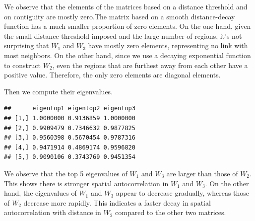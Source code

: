 \documentclass[
  a4paper,
]{article}
\newenvironment{Shaded}{\begin{snugshade}}{\end{snugshade}}
\newcommand{\CommentTok}[1]{\textcolor[rgb]{0.56,0.35,0.01}{\textit{#1}}}
\newcommand{\DecValTok}[1]{\textcolor[rgb]{0.00,0.00,0.81}{#1}}
\newcommand{\FunctionTok}[1]{\textcolor[rgb]{0.13,0.29,0.53}{\textbf{#1}}}
\newcommand{\NormalTok}[1]{#1}
\newcommand{\OtherTok}[1]{\textcolor[rgb]{0.56,0.35,0.01}{#1}}
\newcommand{\SpecialCharTok}[1]{\textcolor[rgb]{0.81,0.36,0.00}{\textbf{#1}}}
\begin{document}
We observe that the elements of the matrices based on a distance
threshold and on contiguity are mostly zero.The matrix based on a smooth
distance-decay function has a much smaller proportion of zero elements.
On the one hand, given the small distance threshold imposed and the
large number of regions, it's not surprising that \(W_1\) and \(W_3\)
have mostly zero elements, representing no link with most neighbors. On
the other hand, since we use a decaying exponential function to
construct \(W_2\), even the regions that are furthest away from each
other have a positive value. Therefore, the only zero elements are
diagonal elements.

Then we compute their eigenvalues.

\begin{Shaded}
\end{Shaded}

\begin{verbatim}
##      eigentop1 eigentop2 eigentop3
## [1,] 1.0000000 0.9136859 1.0000000
## [2,] 0.9909479 0.7346632 0.9877825
## [3,] 0.9560398 0.5670454 0.9787316
## [4,] 0.9471914 0.4869174 0.9596820
## [5,] 0.9090106 0.3743769 0.9451354
\end{verbatim}

We observe that the top 5 eigenvalues of \(W_1\) and \(W_3\) are larger
than those of \(W_2\). This shows there is stronger spatial
autocorrelation in \(W_1\) and \(W_3\). On the other hand, the
eigenvalues of \(W_1\) and \(W_3\) appear to decrease gradually, whereas
those of \(W_2\) decrease more rapidly. This indicates a faster decay in
spatial autocorrelation with distance in \(W_2\) compared to the other
two matrices.
\end{document}
